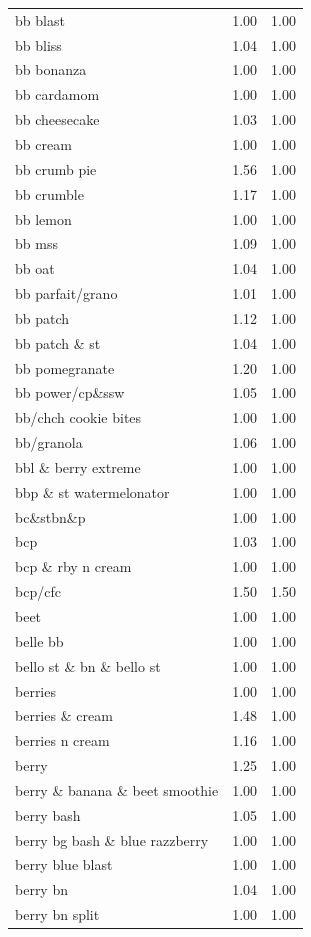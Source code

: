 \begin{table}
\begin{tabular}{lrr}
bb blast & 1.00 & 1.00 \\
bb bliss & 1.04 & 1.00 \\
bb bonanza & 1.00 & 1.00 \\
bb cardamom & 1.00 & 1.00 \\
bb cheesecake & 1.03 & 1.00 \\
bb cream & 1.00 & 1.00 \\
bb crumb pie & 1.56 & 1.00 \\
bb crumble & 1.17 & 1.00 \\
bb lemon & 1.00 & 1.00 \\
bb mss & 1.09 & 1.00 \\
bb oat & 1.04 & 1.00 \\
bb parfait/grano & 1.01 & 1.00 \\
bb patch & 1.12 & 1.00 \\
bb patch \& st & 1.04 & 1.00 \\
bb pomegranate & 1.20 & 1.00 \\
bb power/cp\&ssw & 1.05 & 1.00 \\
bb/chch cookie bites & 1.00 & 1.00 \\
bb/granola & 1.06 & 1.00 \\
bbl \& berry extreme & 1.00 & 1.00 \\
bbp \& st watermelonator & 1.00 & 1.00 \\
bc\&stbn\&p & 1.00 & 1.00 \\
bcp & 1.03 & 1.00 \\
bcp \& rby n cream & 1.00 & 1.00 \\
bcp/cfc & 1.50 & 1.50 \\
beet & 1.00 & 1.00 \\
belle bb & 1.00 & 1.00 \\
bello st \& bn \& bello st & 1.00 & 1.00 \\
berries & 1.00 & 1.00 \\
berries \& cream & 1.48 & 1.00 \\
berries n cream & 1.16 & 1.00 \\
berry & 1.25 & 1.00 \\
berry \& banana \& beet smoothie & 1.00 & 1.00 \\
berry bash & 1.05 & 1.00 \\
berry bg bash \& blue razzberry & 1.00 & 1.00 \\
berry blue blast & 1.00 & 1.00 \\
berry bn & 1.04 & 1.00 \\
berry bn split & 1.00 & 1.00 \\

\end{tabular}
\end{table}
